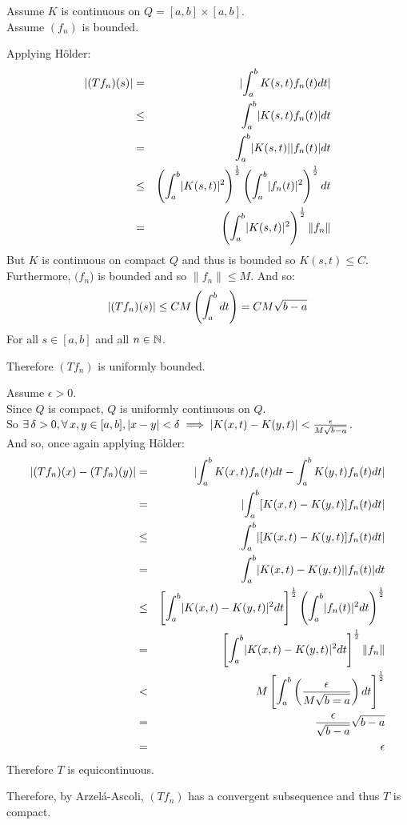 \documentclass[letterpaper,12pt,fleqn]{article}
\newcommand{\norm}[1]{\left\|#1\right\|}
\renewcommand{\d}{\delta}
\newcommand{\e}{\epsilon}
\begin{document}
\begin{theproof}
  Assume $K$ is continuous on $Q=[a,b]\times[a,b]$. \\
  Assume $(f_n)$ is bounded.

  Applying H\"{o}lder:
  \begin{eqnarray*}
    \abs{(Tf_n)(s)} &=& \abs{\int_a^bK(s,t)f_n(t)dt} \\
    &\le& \int_a^b\abs{K(s,t)f_n(t)}dt \\
    &=& \int_a^b\abs{K(s,t)}\abs{f_n(t)}dt \\
    &\le& \left(\int_a^b\abs{K(s,t)}^2\right)^{\frac{1}{2}}
    \left(\int_a^b\abs{f_n(t)}^2\right)^{\frac{1}{2}}dt \\
    &=& \left(\int_a^b\abs{K(s,t)}^2\right)^{\frac{1}{2}}\norm{f_n}
  \end{eqnarray*}
  But $K$ is continuous on compact $Q$ and thus is bounded so $K(s,t)\le C$. \\
  Furthermore, $(f_n$) is bounded and so $\norm{f_n}\le M$.
  And so:
  \[\lvert(Tf_n)(s)\rvert\le CM\left(\int_a^bdt\right)=CM\sqrt{b-a}\]
  For all $s\in[a,b]$ and all $n\in\mathbb{N}$.

  Therefore $(Tf_n)$ is uniformly bounded.

  Assume $\e>0$. \\
  Since $Q$ is compact, $Q$ is uniformly continuous on $Q$. \\
  So $\exists\,\d>0,\forall\,x,y\in[a,b],\abs{x-y}<\d\implies
  \abs{K(x,t)-K(y,t)}<\frac{\e}{M\sqrt{b-a}}$. \\
  And so, once again applying H\"{o}lder:
  \begin{eqnarray*}
    \abs{(Tf_n)(x)-(Tf_n)(y)} &=& \abs{\int_a^bK(x,t)f_n(t)dt-
      \int_a^bK(y,t)f_n(t)dt} \\
    &=& \abs{\int_a^b[K(x,t)-K(y,t)]f_n(t)dt} \\
    &\le& \int_a^b\abs{[K(x,t)-K(y,t)]f_n(t)dt} \\
    &=& \int_a^b\abs{K(x,t)-K(y,t)}\abs{f_n(t)}dt \\
    &\le& \left[\int_a^b\abs{K(x,t)-K(y,t)}^2dt\right]^{\frac{1}{2}}
    \left(\int_a^b\abs{f_n(t)}^2dt\right)^{\frac{1}{2}} \\
    &=& \left[\int_a^b\abs{K(x,t)-K(y,t)}^2dt\right]^{\frac{1}{2}}\norm{f_n} \\
    &<& M\left[\int_a^b\left(\frac{\e}{M\sqrt{b=a}}\right)dt
      \right]^{\frac{1}{2}} \\
    &=& \frac{\e}{\sqrt{b-a}}\sqrt{b-a} \\
    &=& \e
  \end{eqnarray*}
  Therefore $T$ is equicontinuous.

  Therefore, by Arzel\'{a}-Ascoli, $(Tf_n)$ has a convergent subsequence
  and thus $T$ is compact.
\end{theproof}
\end{document}
